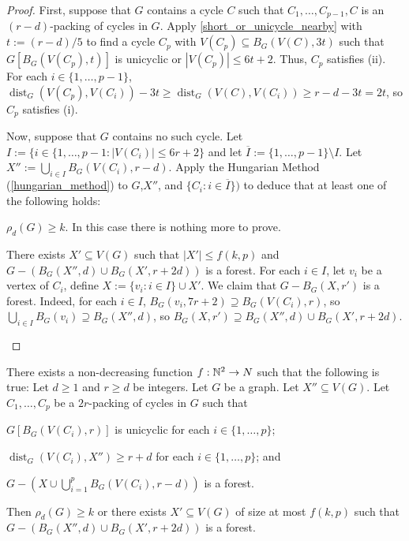 \documentclass{patmorin}
\renewcommand{\ge}{\geqslant}
\renewcommand{\le}{\leqslant}
\DeclareMathOperator{\dist}{dist}
\begin{document}
\begin{proof}
  First, suppose that $G$ contains a cycle $C$ such that $C_1,\ldots,C_{p-1},C$ is an $(r-d)$-packing of cycles in $G$.  Apply \cref{short_or_unicycle_nearby} with $t:=(r-d)/5$ to find a cycle $C_p$ with $V(C_p)\subseteq B_G(V(C),3t)$ such that $G[B_G(V(C_p),t)]$ is unicyclic or $|V(C_p)|\le 6t+2$.  Thus, $C_p$ satisfies (ii).  For each $i\in\{1,\ldots,p-1\}$, $\dist_G(V(C_p),V(C_i))-3t\ge \dist_G(V(C),V(C_i)) \ge r-d - 3t = 2t$, so $C_p$ satisfies (i).

  Now, suppose that $G$ contains no such cycle.  Let $I:=\{i\in\{1,\ldots,p-1:|V(C_i)|\le 6r+2\}$ and let $\overline{I}:=\{1,\ldots,p-1\}\setminus I$.
  Let $X'':=\bigcup_{i\in I}B_G(V(C_i),r-d)$.  Apply the Hungarian Method (\cref{hungarian_method}) to $G$,$X''$, and $\{C_i:i\in\overline{I}\})$ to deduce that at least one of the following holds:
  \begin{compactenum}[(a)]\setcounter{enumi}{1}
    \item $\rho_d(G)\ge k$.  In this case there is nothing more to prove.
    \item There exists $X'\subseteq V(G)$ such that $|X'|\le f(k,p)$ and $G-(B_G(X'',d)\cup B_{G}(X',r+2d))$ is a forest. For each $i\in I$, let $v_i$ be a vertex of $C_i$, define $X:=\{v_i:i\in I\}\cup X'$.  We claim that $G-B_G(X,r')$ is a forest.  Indeed, for each $i\in I$, $B_G(v_i,7r+2)\supseteq B_G(V(C_i),r)$, so $\bigcup_{i\in I}B_G(v_i)\supseteq B_G(X'',d)$, so $B_G(X,r')\supseteq B_G(X'',d)\cup B_{G}(X',r+2d)$. \qedhere
  \end{compactenum}
\end{proof}


\begin{lem}\label{hungarian_method}
  There exists a non-decreasing function $f:\mathbb{N}^2\to N$ such that the following is true: Let $d\ge 1$ and $r\ge d$ be integers.
  Let $G$ be a graph. Let $X''\subseteq V(G)$. Let $C_1,\ldots,C_p$ be a $2r$-packing of cycles in $G$ such that
  \begin{compactenum}
    \item $G[B_G(V(C_i),r)]$ is unicyclic for each $i\in\{1,\ldots,p\}$;
    \item $\dist_G(V(C_i),X'')\ge r+d$ for each $i\in\{1,\ldots,p\}$; and
    \item $G-(X\cup \bigcup_{i=1}^p B_G(V(C_i),r-d))$ is a forest.
  \end{compactenum}
  Then $\rho_d(G)\ge k$ or there exists $X'\subseteq V(G)$ of size at most $f(k,p)$ such that $G-(B_G(X'',d)\cup B_G(X',r+2d))$ is a forest.
\end{lem}
\end{document}
